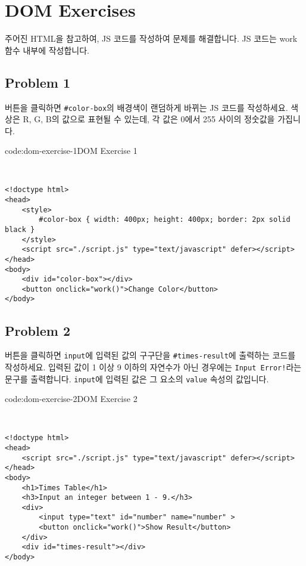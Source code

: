 \section{DOM Exercises} \label{sect:dom-exercises}

주어진 HTML을 참고하여, JS 코드를 작성하여 문제를 해결합니다. JS 코드는 work 함수 내부에 작성합니다. 

\subsection*{Problem 1}

버튼을 클릭하면 \texttt{\#color-box}의 배경색이 랜덤하게 바뀌는 JS 코드를 작성하세요. 색상은 R, G, B의 값으로 표현될 수 있는데, 각 값은 0에서 255 사이의 정숫값을 가집니다.

\begin{codeenv}{code:dom-exercise-1}{DOM Exercise 1}\begin{verbatim}


<!doctype html>
<head>
    <style>
        #color-box { width: 400px; height: 400px; border: 2px solid black }
    </style>
    <script src="./script.js" type="text/javascript" defer></script>
</head>
<body>
    <div id="color-box"></div>
    <button onclick="work()">Change Color</button>
</body>
\end{verbatim}
\end{codeenv}

\subsection*{Problem 2}

버튼을 클릭하면 \texttt{input}에 입력된 값의 구구단을 \texttt{\#times-result}에 출력하는 코드를 작성하세요. 입력된 값이 1 이상 9 이하의 자연수가 아닌 경우에는 \texttt{Input Error!}라는 문구를 출력합니다. \texttt{input}에 입력된 값은 그 요소의 \texttt{value} 속성의 값입니다.

\begin{codeenv}{code:dom-exercise-2}{DOM Exercise 2}\begin{verbatim}


<!doctype html>
<head>
    <script src="./script.js" type="text/javascript" defer></script>
</head>
<body>
    <h1>Times Table</h1>
    <h3>Input an integer between 1 - 9.</h3>
    <div>
        <input type="text" id="number" name="number" >
        <button onclick="work()">Show Result</button>
    </div>
    <div id="times-result"></div>
</body>
\end{verbatim}
\end{codeenv}

